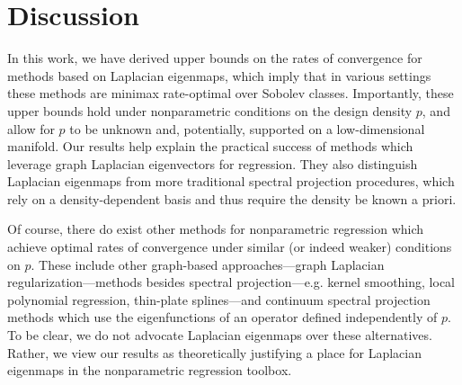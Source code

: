 \section{Discussion}
\label{sec:discussion}

In this work, we have derived upper bounds on the rates of convergence for methods based on Laplacian eigenmaps, which imply that in various settings these methods are minimax rate-optimal over Sobolev classes. Importantly, these upper bounds hold under nonparametric conditions on the design density $p$, and allow for $p$ to be unknown and, potentially, supported on a low-dimensional manifold. Our results help explain the practical success of methods which leverage graph Laplacian eigenvectors for regression. They also distinguish Laplacian eigenmaps from more traditional spectral projection procedures, which rely on a density-dependent basis and thus require the density be known a priori.

Of course, there do exist other methods for nonparametric regression which achieve optimal rates of convergence under similar (or indeed weaker) conditions on $p$. These include other graph-based approaches---graph Laplacian regularization---methods besides spectral projection---e.g. kernel smoothing, local polynomial regression, thin-plate splines---and continuum spectral projection methods which use the eigenfunctions of an operator defined independently of $p$. To be clear, we do not advocate Laplacian eigenmaps over these alternatives. Rather, we view our results as theoretically justifying a place for Laplacian eigenmaps in the nonparametric regression toolbox. 

